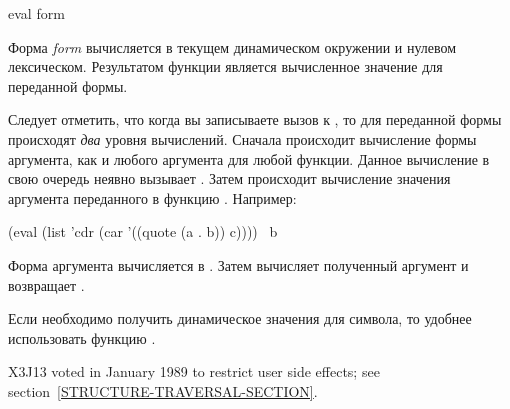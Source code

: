\begin{defun}[Функция]
eval form

Форма \emph{form} вычисляется в текущем динамическом окружении и нулевом
лексическом. Результатом функции является вычисленное значение для переданной
формы.

Следует отметить, что когда вы записываете вызов к , то для переданной
формы происходят \emph{два} уровня вычислений.
Сначала происходит вычисление формы аргумента, как и любого аргумента для любой
функции. Данное вычисление в свою очередь неявно вызывает .
Затем происходит вычисление значения аргумента переданного в функцию .
Например:
\begin{lisp}
(eval (list 'cdr (car '((quote (a . b)) c)))) \EV\ b
\end{lisp}
Форма аргумента  вычисляется в
.
Затем  вычисляет полученный аргумент и возвращает .

Если необходимо получить динамическое значения для символа, то удобнее
использовать функцию .

\begin{new}
X3J13 voted in January 1989
to restrict user side effects; see section~\ref{STRUCTURE-TRAVERSAL-SECTION}.
\end{new}
\end{defun}

